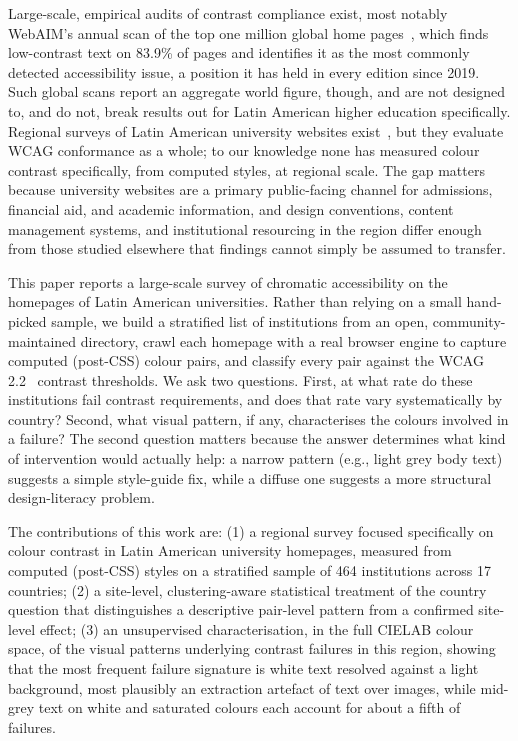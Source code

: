 \documentclass[10pt]{article}
\begin{document}
Large-scale, empirical audits of contrast compliance exist, most notably WebAIM's annual scan of the top one million global home pages~\citep{webaim2026million}, which finds low-contrast text on 83.9\% of pages and identifies it as the most commonly detected accessibility issue, a position it has held in every edition since 2019. Such global scans report an aggregate world figure, though, and are not designed to, and do not, break results out for Latin American higher education specifically. Regional surveys of Latin American university websites exist~\citep*{acostavargas2018challenges}, but they evaluate WCAG conformance as a whole; to our knowledge none has measured colour contrast specifically, from computed styles, at regional scale. The gap matters because university websites are a primary public-facing channel for admissions, financial aid, and academic information, and design conventions, content management systems, and institutional resourcing in the region differ enough from those studied elsewhere that findings cannot simply be assumed to transfer.

This paper reports a large-scale survey of chromatic accessibility on the homepages of Latin American universities. Rather than relying on a small hand-picked sample, we build a stratified list of institutions from an open, community-maintained directory, crawl each homepage with a real browser engine to capture computed (post-CSS) colour pairs, and classify every pair against the WCAG 2.2~\citep{w3c2023wcag} contrast thresholds. We ask two questions. First, at what rate do these institutions fail contrast requirements, and does that rate vary systematically by country? Second, what visual pattern, if any, characterises the colours involved in a failure? The second question matters because the answer determines what kind of intervention would actually help: a narrow pattern (e.g., light grey body text) suggests a simple style-guide fix, while a diffuse one suggests a more structural design-literacy problem.

The contributions of this work are: (1) a regional survey focused specifically on colour contrast in Latin American university homepages, measured from computed (post-CSS) styles on a stratified sample of 464 institutions across 17 countries; (2) a site-level, clustering-aware statistical treatment of the country question that distinguishes a descriptive pair-level pattern from a confirmed site-level effect; (3) an unsupervised characterisation, in the full CIELAB colour space, of the visual patterns underlying contrast failures in this region, showing that the most frequent failure signature is white text resolved against a light background, most plausibly an extraction artefact of text over images, while mid-grey text on white and saturated colours each account for about a fifth of failures.
\end{document}
